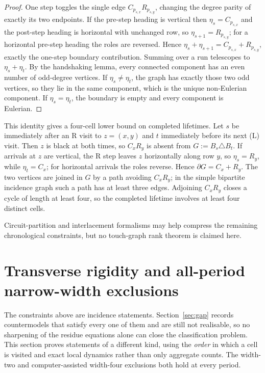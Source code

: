 \documentclass[11pt,reqno]{amsart}
\theoremstyle{plain}
\theoremstyle{definition}
\newcommand{\turnR}{\mathrm{R}}
\newcommand{\turnL}{\mathrm{L}}
\begin{document}
\begin{proof}
One step toggles the single edge $C_{p_{s,x}}R_{p_{s,y}}$, changing the degree
parity of exactly its two endpoints. If the pre-step heading is vertical then
$\eta_s=C_{p_{s,x}}$ and the post-step heading is horizontal with unchanged row,
so $\eta_{s+1}=R_{p_{s,y}}$; for a horizontal pre-step heading the roles are
reversed. Hence $\eta_s+\eta_{s+1}=C_{p_{s,x}}+R_{p_{s,y}}$, exactly the one-step
boundary contribution. Summing over a run telescopes to $\eta_s+\eta_t$. By the
handshaking lemma, every connected component has an even number of odd-degree
vertices. If $\eta_s\ne\eta_t$, the graph has exactly those two odd vertices,
so they lie in the same component, which is the unique non-Eulerian component. If
$\eta_s=\eta_t$, the boundary is empty and every component is Eulerian.
\end{proof}

This identity gives a four-cell lower bound on completed lifetimes. Let $s$ be
immediately after an $\turnR$ visit to $z=(x,y)$ and $t$ immediately before its
next ($\turnL$) visit. Then $z$ is black at both times, so $C_xR_y$ is absent from
$G:=B_s\triangle B_t$. If arrivals at $z$ are vertical, the $\turnR$ step leaves
$z$ horizontally along row $y$, so $\eta_s=R_y$, while $\eta_t=C_x$; for
horizontal arrivals the roles reverse. Hence $\partial G=C_x+R_y$. The two
vertices are joined in $G$ by a path avoiding $C_xR_y$; in the simple bipartite
incidence graph such a path has at least three edges. Adjoining $C_xR_y$ closes a
cycle of length at least four, so the completed lifetime involves at least four
distinct cells.

Circuit-partition and interlacement formalisms may help compress the remaining
chronological constraints, but no touch-graph rank theorem is claimed here.

\section{Transverse rigidity and all-period narrow-width exclusions}\label{sec:transverse}

The constraints above are incidence statements. Section~\ref{sec:gap} records
countermodels that satisfy every one of them and are still not realisable, so no
sharpening of the residue equations alone can close the classification problem. This
section proves statements of a different kind, using the \emph{order} in which a
cell is visited and exact local dynamics rather than only aggregate counts.  The
width-two and computer-assisted width-four exclusions both hold at every period.
\end{document}
